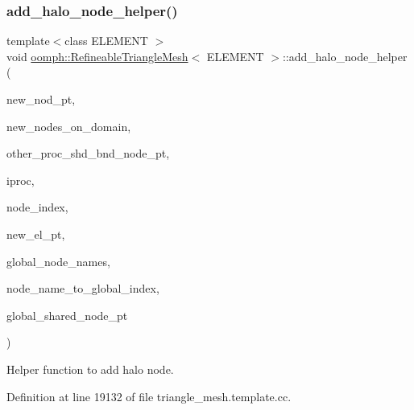 \subsubsection{\texorpdfstring{add\+\_\+halo\+\_\+node\+\_\+helper()}{add\_halo\_node\_helper()}}
{\footnotesize\ttfamily template$<$class E\+L\+E\+M\+E\+NT $>$ \\
void \hyperlink{classoomph_1_1RefineableTriangleMesh}{oomph\+::\+Refineable\+Triangle\+Mesh}$<$ E\+L\+E\+M\+E\+NT $>$\+::add\+\_\+halo\+\_\+node\+\_\+helper (\begin{DoxyParamCaption}\item[{\hyperlink{classoomph_1_1Node}{Node} $\ast$\&}]{new\+\_\+nod\+\_\+pt,  }\item[{\hyperlink{classoomph_1_1Vector}{Vector}$<$ \hyperlink{classoomph_1_1Node}{Node} $\ast$$>$ \&}]{new\+\_\+nodes\+\_\+on\+\_\+domain,  }\item[{\hyperlink{classoomph_1_1Vector}{Vector}$<$ \hyperlink{classoomph_1_1Vector}{Vector}$<$ \hyperlink{classoomph_1_1Vector}{Vector}$<$ std\+::map$<$ unsigned, \hyperlink{classoomph_1_1Node}{Node} $\ast$$>$ $>$ $>$ $>$ \&}]{other\+\_\+proc\+\_\+shd\+\_\+bnd\+\_\+node\+\_\+pt,  }\item[{unsigned \&}]{iproc,  }\item[{unsigned \&}]{node\+\_\+index,  }\item[{\hyperlink{classoomph_1_1FiniteElement}{Finite\+Element} $\ast$const \&}]{new\+\_\+el\+\_\+pt,  }\item[{\hyperlink{classoomph_1_1Vector}{Vector}$<$ \hyperlink{classoomph_1_1Vector}{Vector}$<$ \hyperlink{classoomph_1_1Vector}{Vector}$<$ unsigned $>$ $>$ $>$ \&}]{global\+\_\+node\+\_\+names,  }\item[{std\+::map$<$ \hyperlink{classoomph_1_1Vector}{Vector}$<$ unsigned $>$, unsigned $>$ \&}]{node\+\_\+name\+\_\+to\+\_\+global\+\_\+index,  }\item[{\hyperlink{classoomph_1_1Vector}{Vector}$<$ \hyperlink{classoomph_1_1Node}{Node} $\ast$$>$ \&}]{global\+\_\+shared\+\_\+node\+\_\+pt }\end{DoxyParamCaption})\hspace{0.3cm}{\ttfamily [protected]}}



Helper function to add halo node. 



Definition at line 19132 of file triangle\+\_\+mesh.\+template.\+cc.



